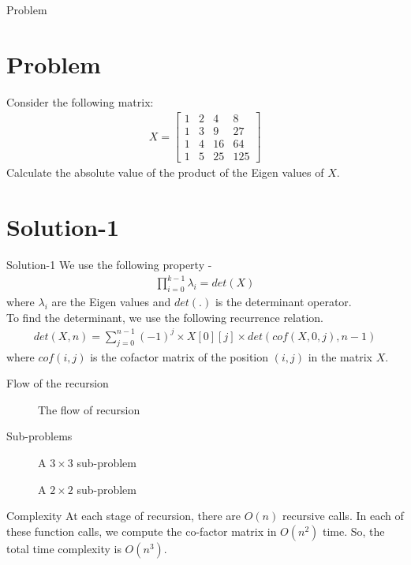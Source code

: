 \begin{frame}{Problem}
    \section{Problem}
    Consider the following matrix:
    \begin{align*}
        X = \begin{bmatrix}
            1 & 2 & 4 & 8 \\
            1 & 3 & 9 & 27 \\
            1 & 4 & 16 & 64 \\
            1 & 5 & 25 & 125
        \end{bmatrix}
    \end{align*}
    Calculate the absolute value of the product of the Eigen values of $X$.

\end{frame}

\section{Solution-1}
\begin{frame}{Solution-1}
    We use the following property -
    \begin{align*}
        \prod_{i = 0}^{k - 1} \lambda_{i} = det(X)
    \end{align*}
    where $\lambda_{i}$ are the Eigen values and $det(.)$ is the determinant operator. \\
    To find the determinant, we use the following recurrence relation.
    \begin{align*}
        det(X, n) = \sum_{j = 0}^{n - 1} (-1) ^ {j} \times X[0][j] \times det(cof(X, 0, j), n - 1)
    \end{align*}
    where $cof(i, j)$ is the cofactor matrix of the position $(i, j)$ in the matrix $X$.
\end{frame}

\begin{frame}{Flow of the recursion}
    \begin{figure}[h!]
	\begin{center}
		\resizebox{\columnwidth/1}{!}{}
	\end{center}
	\caption{The flow of recursion}
	\label{fig:fig1}
\end{figure}
\end{frame}

\begin{frame}{Sub-problems}
    \begin{figure}[h]
    		\resizebox{\columnwidth/2}{!}{}
    	\caption{A $3 \times 3$ sub-problem}
    	\label{fig:fig2}
    \end{figure}
    \begin{figure}[h]
    		\resizebox{\columnwidth/2}{!}{}
    	\caption{A $2 \times 2$ sub-problem}
    	\label{fig:fig3}
    \end{figure}
\end{frame}

\begin{frame}{Complexity}
    At each stage of recursion, there are $O(n)$ recursive calls. In each of these function calls, we compute the co-factor matrix in $O(n ^ 2)$ time. So, the total time complexity is $O(n ^ 3)$.
\end{frame}